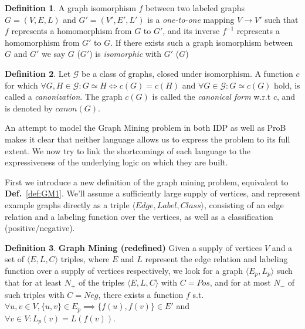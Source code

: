 \documentclass{article}
\theoremstyle{definition}
\newtheorem{definition}{Definition}[section]
\begin{document}
\begin{definition}
A graph isomorphism $f$ between two labeled graphs $G = (V,E,L)$ and $G' = (V',E',L')$ is a \emph{one-to-one} mapping $V \rightarrow V'$ 
such that $f$ represents a homomorphism from $G$ to $G'$,
and its inverse $f^{-1}$ represents a homomorphism from $G'$ to $G$.
If there exists such a graph isomorphism between $G$ and $G'$ we say $G$ ($G'$) is \emph{isomorphic} with $G'$ ($G$)
\end{definition}


\begin{definition}
Let $\mathcal{G}$ be a class of graphs, closed under isomorphism.
A function $c$ for which $\forall G,H \in \mathcal{G} : G \simeq H \iff c(G) = c(H)$ and $\forall G \in \mathcal{G} : G \simeq c(G)$ hold, is called a \emph{canonization}.
The graph $c(G)$ is called the \emph{canonical form} w.r.t $c$, and is denoted by $\mathit{canon}(G)$.
\end{definition}

An attempt to model the Graph Mining problem in both IDP as well as ProB makes it clear
that neither language allows us to express the problem to its full extent.
We now try to link the shortcomings of each language to the expressiveness of the underlying logic on which they are built.

First we introduce a new definition of the graph mining problem, equivalent to \textbf{Def.}~\ref{def:GM1}.
We'll assume a sufficiently large supply of vertices, and represent example graphs directly as a triple $\langle Edge, Label, Class\rangle$, consisting of an edge relation and a labeling function over the vertices, as well as a classification (positive/negative).

\begin{definition} \textbf{Graph Mining (redefined)}
Given a supply of vertices $V$ and a set of $\langle E, L, C\rangle$ triples,
where $E$ and $L$ represent the edge relation and labeling function over a supply of vertices respectively,
we look for a graph $\langle E_{p}, L_{p}\rangle$ such that
for at least $N_{+}$ of the triples $\langle E, L, C\rangle$ with $C=Pos$, and for at most $N_{-}$ of such triples with $C=Neg$, there exists a function $f$ s.t. $\forall u,v \in V, \lbrace u,v\rbrace \in E_{p} \implies \lbrace f(u),f(v)\rbrace \in E'$ and $\forall v \in V : L_{p}(v) = L(f(v))$.
\end{definition}
\end{document}
